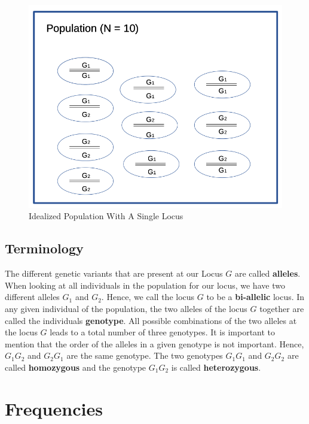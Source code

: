 \documentclass[
]{book}
\theoremstyle{definition}
\theoremstyle{definition}
\theoremstyle{definition}
\theoremstyle{remark}
\begin{document}
\begin{figure}
\includegraphics[width=10.58in]{odg/idealpopsingletrait} \caption{Idealized Population With A Single Locus}\label{fig:idealpopsingletrait}
\end{figure}

\hypertarget{qg-terminology}{%
\subsection{Terminology}\label{qg-terminology}}

The different genetic variants that are present at our Locus \(G\) are called \textbf{alleles}. When looking at all individuals in the population for our locus, we have two different alleles \(G_1\) and \(G_2\). Hence, we call the locus \(G\) to be a \textbf{bi-allelic} locus. In any given individual of the population, the two alleles of the locus \(G\) together are called the individuals \textbf{genotype}. All possible combinations of the two alleles at the locus \(G\) leads to a total number of three genotypes. It is important to mention that the order of the alleles in a given genotype is not important. Hence, \(G_1G_2\) and \(G_2G_1\) are the same genotype. The two genotypes \(G_1G_1\) and \(G_2G_2\) are called \textbf{homozygous} and the genotype \(G_1G_2\) is called \textbf{heterozygous}.

\hypertarget{qg-frequency}{%
\section{Frequencies}\label{qg-frequency}}
\end{document}
